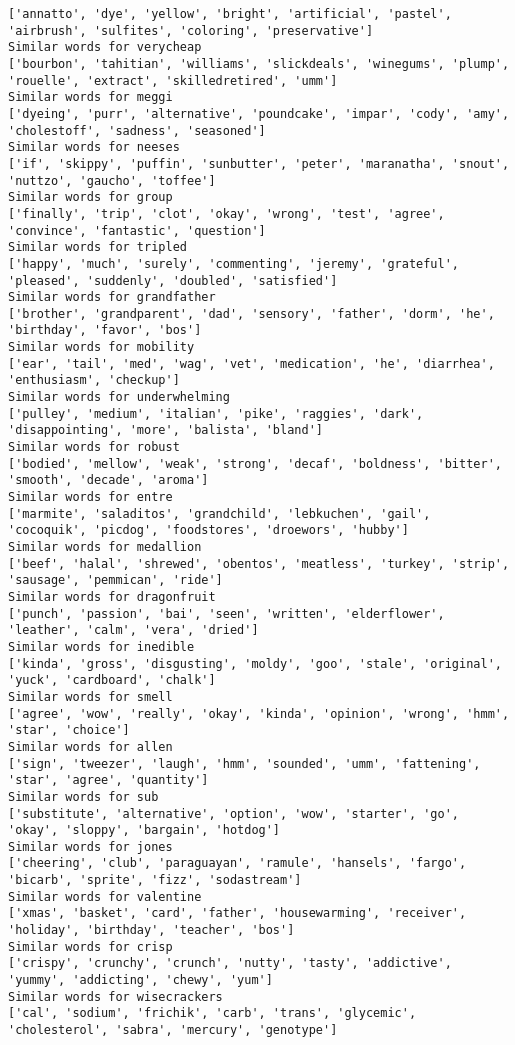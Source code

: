 \documentclass[11pt]{article}
\begin{document}
\begin{Verbatim}[commandchars=\\\{\}]
['annatto', 'dye', 'yellow', 'bright', 'artificial', 'pastel', 'airbrush', 'sulfites', 'coloring', 'preservative']
Similar words for verycheap
['bourbon', 'tahitian', 'williams', 'slickdeals', 'winegums', 'plump', 'rouelle', 'extract', 'skilledretired', 'umm']
Similar words for meggi
['dyeing', 'purr', 'alternative', 'poundcake', 'impar', 'cody', 'amy', 'cholestoff', 'sadness', 'seasoned']
Similar words for neeses
['if', 'skippy', 'puffin', 'sunbutter', 'peter', 'maranatha', 'snout', 'nuttzo', 'gaucho', 'toffee']
Similar words for group
['finally', 'trip', 'clot', 'okay', 'wrong', 'test', 'agree', 'convince', 'fantastic', 'question']
Similar words for tripled
['happy', 'much', 'surely', 'commenting', 'jeremy', 'grateful', 'pleased', 'suddenly', 'doubled', 'satisfied']
Similar words for grandfather
['brother', 'grandparent', 'dad', 'sensory', 'father', 'dorm', 'he', 'birthday', 'favor', 'bos']
Similar words for mobility
['ear', 'tail', 'med', 'wag', 'vet', 'medication', 'he', 'diarrhea', 'enthusiasm', 'checkup']
Similar words for underwhelming
['pulley', 'medium', 'italian', 'pike', 'raggies', 'dark', 'disappointing', 'more', 'balista', 'bland']
Similar words for robust
['bodied', 'mellow', 'weak', 'strong', 'decaf', 'boldness', 'bitter', 'smooth', 'decade', 'aroma']
Similar words for entre
['marmite', 'saladitos', 'grandchild', 'lebkuchen', 'gail', 'cocoquik', 'picdog', 'foodstores', 'droewors', 'hubby']
Similar words for medallion
['beef', 'halal', 'shrewed', 'obentos', 'meatless', 'turkey', 'strip', 'sausage', 'pemmican', 'ride']
Similar words for dragonfruit
['punch', 'passion', 'bai', 'seen', 'written', 'elderflower', 'leather', 'calm', 'vera', 'dried']
Similar words for inedible
['kinda', 'gross', 'disgusting', 'moldy', 'goo', 'stale', 'original', 'yuck', 'cardboard', 'chalk']
Similar words for smell
['agree', 'wow', 'really', 'okay', 'kinda', 'opinion', 'wrong', 'hmm', 'star', 'choice']
Similar words for allen
['sign', 'tweezer', 'laugh', 'hmm', 'sounded', 'umm', 'fattening', 'star', 'agree', 'quantity']
Similar words for sub
['substitute', 'alternative', 'option', 'wow', 'starter', 'go', 'okay', 'sloppy', 'bargain', 'hotdog']
Similar words for jones
['cheering', 'club', 'paraguayan', 'ramule', 'hansels', 'fargo', 'bicarb', 'sprite', 'fizz', 'sodastream']
Similar words for valentine
['xmas', 'basket', 'card', 'father', 'housewarming', 'receiver', 'holiday', 'birthday', 'teacher', 'bos']
Similar words for crisp
['crispy', 'crunchy', 'crunch', 'nutty', 'tasty', 'addictive', 'yummy', 'addicting', 'chewy', 'yum']
Similar words for wisecrackers
['cal', 'sodium', 'frichik', 'carb', 'trans', 'glycemic', 'cholesterol', 'sabra', 'mercury', 'genotype']

\end{Verbatim}
\end{document}
